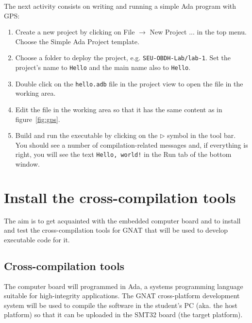 The next activity consists on writing and running a simple Ada program with GPS:
\begin{enumerate}
\item 	Create a new project by clicking on File $\rightarrow$ New Project ...
        in the top menu. Choose the Simple Ada Project template.

\item	Choose a folder to deploy the project, e.g. \textcolor{mPurple}{\texttt{SEU-OBDH-Lab/lab-1}}.
        Set the project's name to \texttt{Hello} and the main name also to \texttt{Hello}.
        
\item	Double click on the \texttt{hello.adb} file in the project view to open the file in the working area.

\item	Edit the file in the working area so that it has the same content as in figure~\ref{fig:gps}.

\item	Build and run the executable by clicking on the $\rhd$ symbol in the tool bar.
You should see a number of compilation-related messages and,
if everything is right, you will see the text \texttt{Hello, world!}
in the Run tab of the bottom window.
\end{enumerate}

\section{Install the cross-compilation tools}

The aim is to get acquainted with the embedded computer board
and to install and test the cross-compilation tools for GNAT
that will be used to develop executable code for it.

\subsection{Cross-compilation tools}

The computer board will programmed in Ada,
a systems programming language suitable for high-integrity applications.
The GNAT cross-platform development system
will be used to compile the software in the student's PC (aka. the host platform)
so that it can be uploaded in the SMT32 board (the target platform).

